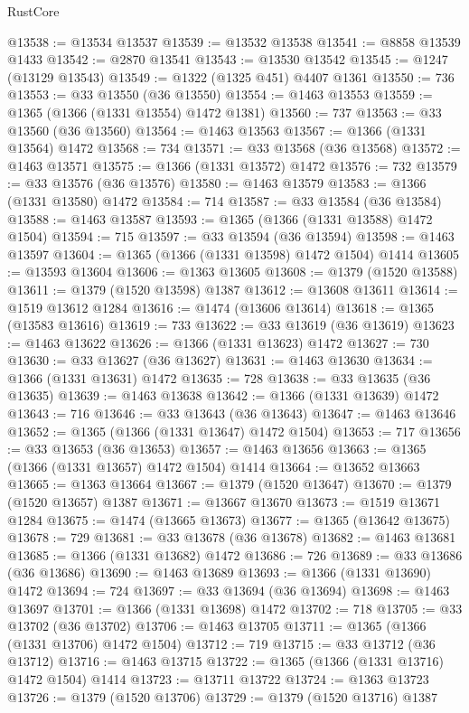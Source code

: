 \begin{lexlean}{RustCore}
\begin{coremodule}
@13538 := @13534 @13537
@13539 := @13532 @13538
@13541 := @8858 @13539 @1433
@13542 := @2870 @13541
@13543 := @13530 @13542
@13545 := @1247 (@13129 @13543)
@13549 := @1322 (@1325 @451) @4407 @1361
@13550 := 736
@13553 := @33 @13550 (@36 @13550)
@13554 := @1463 @13553
@13559 := @1365 (@1366 (@1331 @13554) @1472 @1381)
@13560 := 737
@13563 := @33 @13560 (@36 @13560)
@13564 := @1463 @13563
@13567 := @1366 (@1331 @13564) @1472
@13568 := 734
@13571 := @33 @13568 (@36 @13568)
@13572 := @1463 @13571
@13575 := @1366 (@1331 @13572) @1472
@13576 := 732
@13579 := @33 @13576 (@36 @13576)
@13580 := @1463 @13579
@13583 := @1366 (@1331 @13580) @1472
@13584 := 714
@13587 := @33 @13584 (@36 @13584)
@13588 := @1463 @13587
@13593 := @1365 (@1366 (@1331 @13588) @1472 @1504)
@13594 := 715
@13597 := @33 @13594 (@36 @13594)
@13598 := @1463 @13597
@13604 := @1365 (@1366 (@1331 @13598) @1472 @1504) @1414
@13605 := @13593 @13604
@13606 := @1363 @13605
@13608 := @1379 (@1520 @13588)
@13611 := @1379 (@1520 @13598) @1387
@13612 := @13608 @13611
@13614 := @1519 @13612 @1284
@13616 := @1474 (@13606 @13614)
@13618 := @1365 (@13583 @13616)
@13619 := 733
@13622 := @33 @13619 (@36 @13619)
@13623 := @1463 @13622
@13626 := @1366 (@1331 @13623) @1472
@13627 := 730
@13630 := @33 @13627 (@36 @13627)
@13631 := @1463 @13630
@13634 := @1366 (@1331 @13631) @1472
@13635 := 728
@13638 := @33 @13635 (@36 @13635)
@13639 := @1463 @13638
@13642 := @1366 (@1331 @13639) @1472
@13643 := 716
@13646 := @33 @13643 (@36 @13643)
@13647 := @1463 @13646
@13652 := @1365 (@1366 (@1331 @13647) @1472 @1504)
@13653 := 717
@13656 := @33 @13653 (@36 @13653)
@13657 := @1463 @13656
@13663 := @1365 (@1366 (@1331 @13657) @1472 @1504) @1414
@13664 := @13652 @13663
@13665 := @1363 @13664
@13667 := @1379 (@1520 @13647)
@13670 := @1379 (@1520 @13657) @1387
@13671 := @13667 @13670
@13673 := @1519 @13671 @1284
@13675 := @1474 (@13665 @13673)
@13677 := @1365 (@13642 @13675)
@13678 := 729
@13681 := @33 @13678 (@36 @13678)
@13682 := @1463 @13681
@13685 := @1366 (@1331 @13682) @1472
@13686 := 726
@13689 := @33 @13686 (@36 @13686)
@13690 := @1463 @13689
@13693 := @1366 (@1331 @13690) @1472
@13694 := 724
@13697 := @33 @13694 (@36 @13694)
@13698 := @1463 @13697
@13701 := @1366 (@1331 @13698) @1472
@13702 := 718
@13705 := @33 @13702 (@36 @13702)
@13706 := @1463 @13705
@13711 := @1365 (@1366 (@1331 @13706) @1472 @1504)
@13712 := 719
@13715 := @33 @13712 (@36 @13712)
@13716 := @1463 @13715
@13722 := @1365 (@1366 (@1331 @13716) @1472 @1504) @1414
@13723 := @13711 @13722
@13724 := @1363 @13723
@13726 := @1379 (@1520 @13706)
@13729 := @1379 (@1520 @13716) @1387

\end{coremodule}
\end{lexlean}
